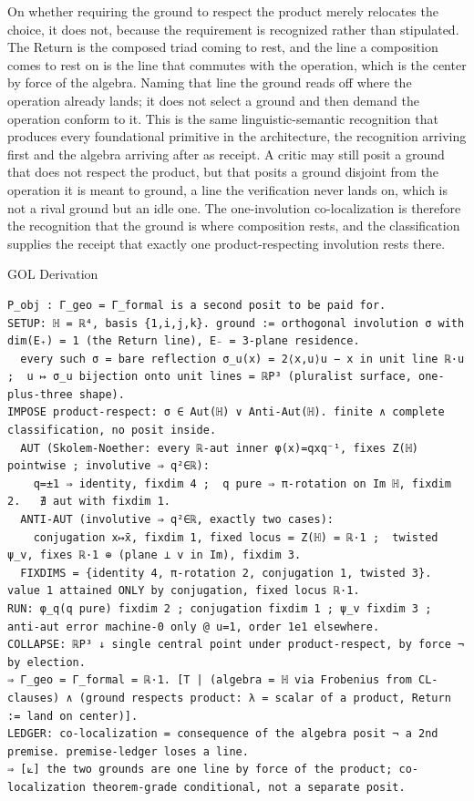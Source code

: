 \documentclass[10pt,twocolumn]{article}
\begin{document}
On whether requiring the ground to respect the product merely relocates
the choice, it does not, because the requirement is recognized rather
than stipulated. The Return is the composed triad coming to rest, and
the line a composition comes to rest on is the line that commutes with
the operation, which is the center by force of the algebra. Naming that
line the ground reads off where the operation already lands; it does not
select a ground and then demand the operation conform to it. This is the
same linguistic-semantic recognition that produces every foundational
primitive in the architecture, the recognition arriving first and the
algebra arriving after as receipt. A critic may still posit a ground
that does not respect the product, but that posits a ground disjoint
from the operation it is meant to ground, a line the verification never
lands on, which is not a rival ground but an idle one. The
one-involution co-localization is therefore the recognition that the
ground is where composition rests, and the classification supplies the
receipt that exactly one product-respecting involution rests there.

\begin{golbox}{GOL Derivation}
\begin{lstlisting}[style=golv]
P_obj : Γ_geo = Γ_formal is a second posit to be paid for.
SETUP: ℍ = ℝ⁴, basis {1,i,j,k}. ground := orthogonal involution σ with dim(E₊) = 1 (the Return line), E₋ = 3-plane residence.
  every such σ = bare reflection σ_u(x) = 2⟨x,u⟩u − x in unit line ℝ·u ;  u ↦ σ_u bijection onto unit lines = ℝP³ (pluralist surface, one-plus-three shape).
IMPOSE product-respect: σ ∈ Aut(ℍ) ∨ Anti-Aut(ℍ). finite ∧ complete classification, no posit inside.
  AUT (Skolem-Noether: every ℝ-aut inner φ(x)=qxq⁻¹, fixes Z(ℍ) pointwise ; involutive ⇒ q²∈ℝ):
    q=±1 ⇒ identity, fixdim 4 ;  q pure ⇒ π-rotation on Im ℍ, fixdim 2.   ∄ aut with fixdim 1.
  ANTI-AUT (involutive ⇒ q²∈ℝ, exactly two cases):
    conjugation x↦x̄, fixdim 1, fixed locus = Z(ℍ) = ℝ·1 ;  twisted ψ_v, fixes ℝ·1 ⊕ (plane ⊥ v in Im), fixdim 3.
  FIXDIMS = {identity 4, π-rotation 2, conjugation 1, twisted 3}.  value 1 attained ONLY by conjugation, fixed locus ℝ·1.
RUN: φ_q(q pure) fixdim 2 ; conjugation fixdim 1 ; ψ_v fixdim 3 ; anti-aut error machine-0 only @ u=1, order 1e1 elsewhere.
COLLAPSE: ℝP³ ↓ single central point under product-respect, by force ¬ by election.
⇒ Γ_geo = Γ_formal = ℝ·1. [T | (algebra = ℍ via Frobenius from CL-clauses) ∧ (ground respects product: λ = scalar of a product, Return := land on center)].
LEDGER: co-localization = consequence of the algebra posit ¬ a 2nd premise. premise-ledger loses a line.
⇒ [⟀] the two grounds are one line by force of the product; co-localization theorem-grade conditional, not a separate posit.
\end{lstlisting}
\end{golbox}
\end{document}
